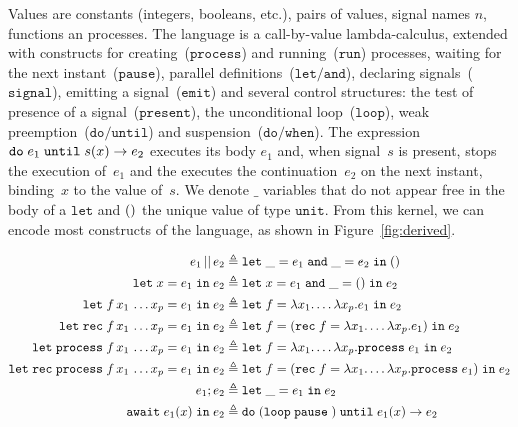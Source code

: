 \documentclass[9pt,preprint]{sigplanconf}
\newcommand{\deq}{\triangleq}
\begin{document}
Values are constants (integers, booleans, etc.), pairs of values, signal names $n$, functions an processes. The language is a call-by-value lambda-calculus, extended with constructs for creating~($\mathtt{process}$) and running~($\mathtt{run}$) processes, waiting for the next instant~($\mathtt{pause}$), parallel definitions~($\mathtt{let/and}$), declaring signals~($\mathtt{signal}$), emitting a signal~($\mathtt{emit}$) and several control structures: the test of presence of a signal~($\mathtt{present}$), the unconditional loop~($\mathtt{loop}$), weak preemption~($\mathtt{do/until}$) and suspension~($\mathtt{do/when}$).  The expression $\mathtt{do}\; e_1 \;\mathtt{until}\; s(x) \rightarrow e_2$ executes its body $e_1$ and, when signal~$s$ is present, stops the execution of~$e_1$ and the executes the continuation~$e_2$ on the next instant, binding~$x$ to the value of~$s$. We denote $\_$ variables that do not appear free in the body of a $\mathtt{let}$ and $\mathtt{()}{}$ the unique value of type $\mathtt{unit}$. From this kernel, we can encode most constructs of the language, as shown in Figure~\ref{fig:derived}.
%
\begin{figure*}

\begin{small}
\begin{align*}
\epar{e_1}{e_2} \deq &\; \eletpar{\_}{e_1}{\_}{e_2}{\evoid{}} \\
\elet{x}{e_1}{e_2} \deq &\; \eletpar{x}{e_1}{\_}{\evoid{}}{e_2} \\
\mathidl{let} f\, x_1\, \ldots x_p = e_1 \mathid{in} e_2
      \deq &\; \elet{f}{\elam{x_1}{\ldots \elam{x_p}{e_1}}}{e_2} \\
\mathidl{let} \mathidl{rec} f\, x_1\, \ldots x_p = e_1 \mathid{in} e_2
      \deq &\; \elet{f}{ (\erec{f}{\elam{x_1}{\ldots \elam{x_p}{e_1}}}) }{e_2} \\
\mathidl{let} \mathidl{process} f\, x_1\, \ldots x_p = e_1 \mathid{in} e_2
      \deq &\; \elet{f}{\elam{x_1}{\ldots \elam{x_p}{ \eproc{e_1} }}}{e_2} \\     
\mathidl{let} \mathidl{rec} \mathidl{process} f\, x_1\, \ldots x_p = e_1 \mathid{in} e_2
            \deq &\; \elet{f}{ (\erec{f}{\elam{x_1}{\ldots \elam{x_p}{\eproc{e_1}}}}) }{e_2} \\
\eseq{e_1}{e_2} \deq &\; \elet{\_}{e_1}{e_2}  \\
\eawait{e_1}{x}{e_2} \deq&\; \euntil{ (\eloop{\epause{}}) }{e_1}{x}{e_2}
\end{align*}
\end{small}

\caption{Derived language constructs}
\label{fig:derived}
\end{figure*}
\end{document}

